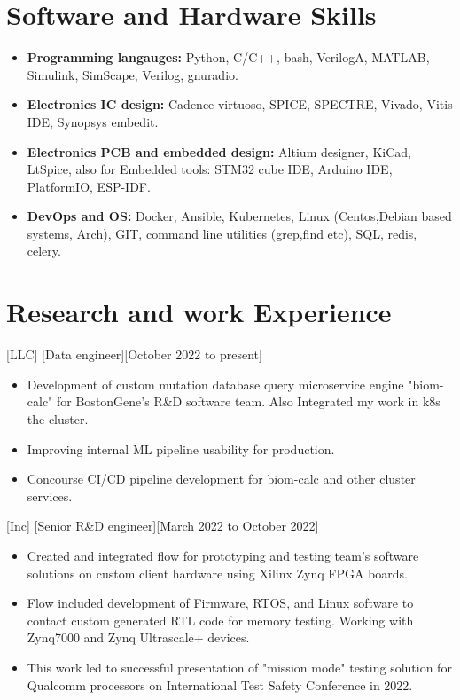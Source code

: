 \documentclass{article}
\begin{document}
\section{Software and Hardware Skills}
\begin{itemize}
\item \textbf{Programming langauges:} Python, C/C++, bash, VerilogA, MATLAB, Simulink, SimScape, Verilog, gnuradio. 
\item \textbf{Electronics IC design:} Cadence virtuoso, SPICE, SPECTRE, Vivado, Vitis IDE, Synopsys embedit.
\item \textbf{Electronics PCB and embedded design:} Altium designer, KiCad, LtSpice, also for Embedded tools: STM32 cube IDE, Arduino IDE, PlatformIO, ESP-IDF.
\item \textbf{DevOps and OS:} Docker, Ansible, Kubernetes, Linux (Centos,Debian based systems, Arch), GIT, command line utilities (grep,find etc), SQL, redis, celery.
\end{itemize}

\section{Research and work Experience}
 


[LLC]
[Data engineer][October 2022 to present]
   \begin{itemize}
      \item Development of custom mutation database query microservice engine "biom-calc" for BostonGene's R\&D software team. Also Integrated my work in k8s the cluster.
      \item Improving internal ML pipeline usability for production.
      \item Concourse CI/CD pipeline development for biom-calc and other cluster services.
    \end{itemize}
 
[Inc]
[Senior R\&D engineer][March 2022 to October 2022]
   \begin{itemize}
      \item Created and integrated flow for prototyping and testing team's software solutions on custom client hardware using Xilinx Zynq FPGA boards.
      \item Flow included development of Firmware, RTOS, and Linux software to contact custom generated RTL code for memory testing. Working with Zynq7000 and Zynq Ultrascale+ devices.
      \item This work led to successful presentation of "mission mode" testing solution for Qualcomm processors on International Test Safety Conference in 2022.
   \end{itemize}
\end{document}
